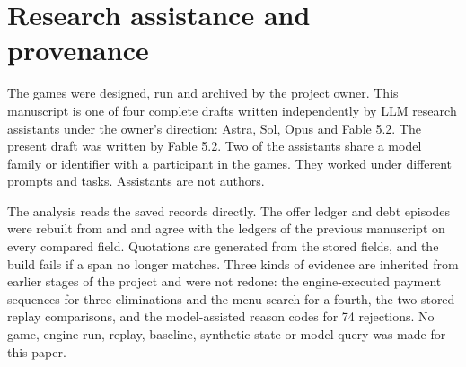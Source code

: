 \section{Research assistance and provenance}
\label{app:provenance}

The games were designed, run and archived by the project owner. This manuscript is one of four complete drafts written independently by LLM research assistants under the owner's direction: Astra, Sol, Opus and Fable 5.2. The present draft was written by Fable 5.2. Two of the assistants share a model family or identifier with a participant in the games. They worked under different prompts and tasks. Assistants are not authors.

The analysis reads the saved records directly. The offer ledger and debt episodes were rebuilt from  and  and agree with the ledgers of the previous manuscript on every compared field. Quotations are generated from the stored fields, and the build fails if a span no longer matches. Three kinds of evidence are inherited from earlier stages of the project and were not redone: the engine-executed payment sequences for three eliminations and the menu search for a fourth, the two stored replay comparisons, and the model-assisted reason codes for 74 rejections. No game, engine run, replay, baseline, synthetic state or model query was made for this paper.
